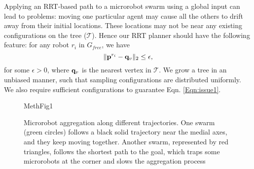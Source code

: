Applying an RRT-based path to a microrobot swarm using a global input can lead to problems: moving one particular agent may cause all the others to drift away from their initial locations.
These locations may not be near any existing configurations on the tree ($\mathcal{T}$). Hence our RRT planner should have the following feature: for any robot $r_i$ in $G_{free}$, we have
\begin{equation}\label{Eqn:issue1}
\|{\bf p}^{r_i}-{\bf q}_v\|_2\le \epsilon,
\end{equation}
for some $\epsilon>0$,  where ${\bf q}_v$ is the nearest vertex in $\mathcal{T}$. We grow a tree in an unbiased manner, such that sampling configurations are distributed uniformly. We also require sufficient configurations to guarantee Eqn. \ref{Eqn:issue1}.
%
\begin{figure}[h]
	\vspace{2 mm}
	\centering
	\begin{overpic}[width=0.7\columnwidth]{MethFig1}
	\end{overpic}
	
	\caption{\label{fig:MethFig1} Microrobot aggregation along different trajectories. 
		One swarm (green circles) follows a black solid trajectory near the medial axes, and they keep moving together. Another swarm, represented by red triangles, follows the shortest path to the goal, which traps some microrobots at the corner and slows the aggregation process}
\end{figure}

